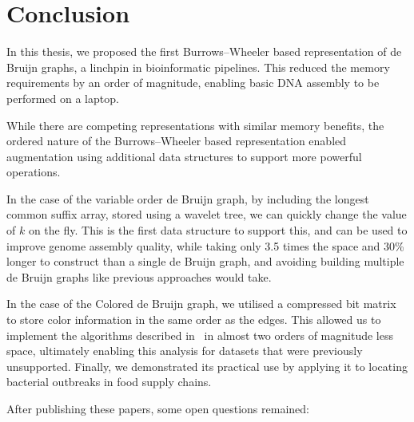 \chapter{Conclusion}
\label{sec:conclusion}

In this thesis, we proposed the first Burrows--Wheeler based representation of de Bruijn graphs, a linchpin in bioinformatic pipelines. This reduced the memory requirements by an order of magnitude, enabling basic DNA assembly to be performed on a laptop.

While there are competing representations with similar memory benefits, the ordered nature of the Burrows--Wheeler based representation enabled augmentation using additional data structures to support more powerful operations.

In the case of the variable order de Bruijn graph, by including the longest common suffix array, stored using a wavelet tree, we can quickly change the value of $k$ on the fly. This is the first data structure to support this, and can be used to improve genome assembly quality, while taking only 3.5 times the space and 30\% longer to construct than a single de Bruijn graph, and avoiding building multiple de Bruijn graphs like previous approaches would take.

In the case of the Colored de Bruijn graph, we utilised a compressed bit matrix to store color information in the same order as the edges. This allowed us to implement the algorithms described in~\cite{ICTFM12} in almost two orders of magnitude less space, ultimately enabling this analysis for datasets that were previously unsupported. Finally, we demonstrated its practical use by applying it to locating bacterial outbreaks in food supply chains.

After publishing these papers, some open questions remained:

